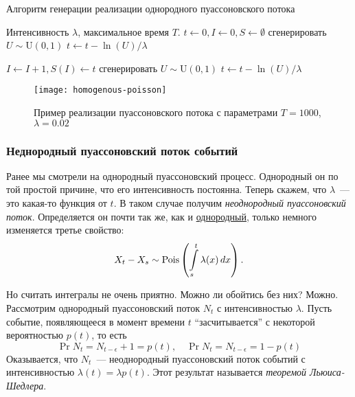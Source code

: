 \begin{algorithm}[H]
	\caption{Алгоритм генерации реализации однородного пуассоновского потока}
	\label{algo:homogenous-poisson}
	\begin{algorithmic}[1]
		\Require Интенсивность \(\lambda\), максимальное время \(T\).
		\State \(t \gets 0, I \gets 0, S \gets \emptyset\)
		\State сгенерировать \(U \sim \mathrm{U}(0, 1)\)
		\State \(t \gets t - \ln(U)/\lambda\)
	\end{algorithmic}
\end{algorithm}
\begin{algorithm}
	\begin{algorithmic}[1]
			\State \(I \gets I + 1, S(I) \gets t\)
			\State сгенерировать \(U \sim \mathrm{U}(0, 1)\)
			\State \(t \gets t - \ln(U)/\lambda\)
		\EndWhile
	\end{algorithmic}
\end{algorithm}

\begin{figure}[H]
	\centering\texttt{[image: homogenous-poisson]}
	\caption{Пример реализации пуассоновского потока с параметрами \(T = 
	1000\), \(\lambda = 0.02\)}
\end{figure}

\subsubsection{Неднородный пуассоновский поток событий}
Ранее мы смотрели на однородный пуассоновский процесс. Однородный он по той 
простой причине, что его интенсивность постоянна. Теперь скажем, что 
\(\lambda\)~--- это какая-то функция от \(t\). В таком случае получим 
\emph{неоднородный пуассоновский поток}. Определяется он почти так же, как и  
\hyperref[poisson-process-def]{однородный}, только немного изменяется третье 
свойство:
\[
	X_{t} - X_{s} \sim \mathrm{Pois}\left(\int\limits_{s}^{t} \lambda(x)\mathop{}\!d 
	x\right). 
\]

Но считать интегралы не очень приятно. Можно ли обойтись без них? Можно. 
Рассмотрим однородный пуассоновский поток \(N_{t}\) с интенсивностью 
\(\lambda\). Пусть событие, появляющееся в момент времени \(t\) 
``засчитывается'' с некоторой вероятностью \(p(t)\), то есть
\[
	\Pr{N_t = N_{t - \epsilon} + 1} = p(t), \quad \Pr{N_t = N_{t - \epsilon}} = 
	1 - p(t)
\]
Оказывается, что \(N_{t}\)~--- неоднородный пуассоновский поток событий с 
интенсивностью \(\lambda(t) = \lambda p(t)\). Этот результат называется 
\emph{теоремой Льюиса-Шедлера}.%

